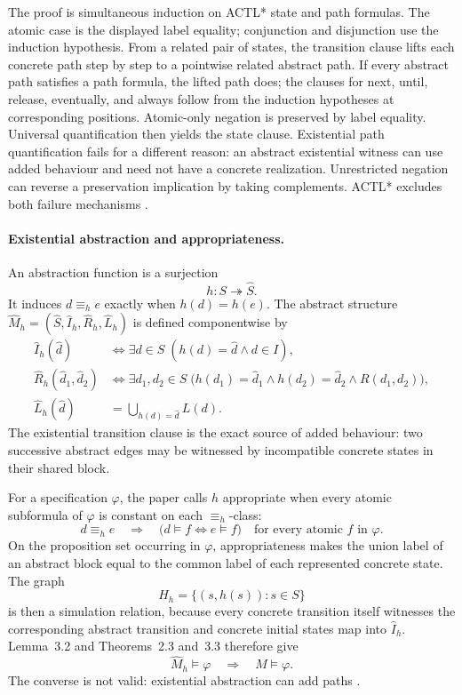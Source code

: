 The proof is simultaneous induction on ACTL* state and path formulas.
The atomic case is the displayed label equality; conjunction and disjunction
use the induction hypothesis.  From a related pair of states, the transition
clause lifts each concrete path step by step to a pointwise related abstract
path.  If every abstract path satisfies a path formula, the lifted path does;
the clauses for next, until, release, eventually, and always follow from the
induction hypotheses at corresponding positions.  Atomic-only negation is
preserved by label equality.  Universal quantification then yields the state
clause.  Existential path quantification fails for a different reason: an
abstract existential witness can use added behaviour and need not have a
concrete realization.  Unrestricted negation can reverse a preservation
implication by taking complements.  ACTL* excludes both failure mechanisms
\cite[\S2.4 and thm.~2.3]{ClarkeEtAl2003}.

\paragraph{Existential abstraction and appropriateness.}
An abstraction function is a surjection
\[
 h:S\twoheadrightarrow\widehat S.
\]
It induces \(d\equiv_h e\) exactly when \(h(d)=h(e)\).  The abstract structure
\(\widehat M_h=(\widehat S,\widehat I_h,\widehat R_h,\widehat L_h)\) is
defined componentwise by
\[
\begin{aligned}
 \widehat I_h(\widehat d)
  &\iff\exists d\in S\;(h(d)=\widehat d\land d\in I),\\
 \widehat R_h(\widehat d_1,\widehat d_2)
  &\iff\exists d_1,d_2\in S\;
       \bigl(h(d_1)=\widehat d_1\land h(d_2)=\widehat d_2
             \land R(d_1,d_2)\bigr),\\
 \widehat L_h(\widehat d)
  &=\bigcup_{h(d)=\widehat d}L(d).
\end{aligned}
\]
The existential transition clause is the exact source of added behaviour: two
successive abstract edges may be witnessed by incompatible concrete states in
their shared block.

For a specification \(\varphi\), the paper calls \(h\) appropriate when every
atomic subformula of \(\varphi\) is constant on each \(\equiv_h\)-class:
\[
 d\equiv_h e
 \quad\Longrightarrow\quad
 \bigl(d\models f\iff e\models f\bigr)
 \quad\text{for every atomic }f\text{ in }\varphi.
\]
On the proposition set occurring in \(\varphi\), appropriateness makes the
union label of an abstract block equal to the common label of each represented
concrete state.  The graph
\[
 H_h=\{(s,h(s)):s\in S\}
\]
is then a simulation relation, because every concrete transition itself
witnesses the corresponding abstract transition and concrete initial states
map into \(\widehat I_h\).  Lemma~3.2 and Theorems~2.3 and~3.3 therefore give
\[
 \widehat M_h\models\varphi
 \quad\Longrightarrow\quad
 M\models\varphi.
\]
The converse is not valid: existential abstraction can add paths
\cite[\S3 and thm.~3.3]{ClarkeEtAl2003}.

